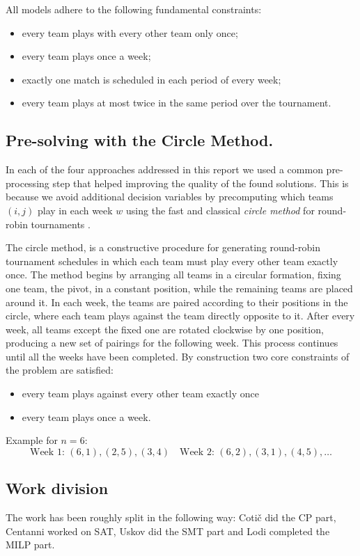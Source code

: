 All models adhere to the following fundamental constraints:
\begin{itemize}
\item every team plays with every other team only once;
\item every team plays once a week;
\item exactly one match is scheduled in each period of every week;
\item every team plays at most twice in the same period over the tournament.
\end{itemize}

\subsection{Pre-solving with the Circle Method.}
\label{CircleMatching}
In each of the four approaches addressed in this report we used a common pre-processing step that helped improving the quality of the found solutions. This is because we avoid additional decision variables by precomputing which teams $(i, j)$ play in each week $w$ using the fast and classical \emph{circle method} for round-robin tournaments \cite{dewerra1999}.

The circle method, is a constructive procedure for generating round-robin tournament schedules in which each team must play every other team exactly once. The method begins by arranging all teams in a circular formation, fixing one team, the pivot, in a constant position, while the remaining teams are placed around it. In each week, the teams are paired according to their positions in the circle, where each team plays against the team directly opposite to it. After every week, all teams except the fixed one are rotated clockwise by one position, producing a new set of pairings for the following week. This process continues until all the weeks have been completed. By construction two core constraints of the problem are satisfied:
\begin{itemize}
    \item every team plays against every other team exactly once
    \item every team plays once a week.
\end{itemize}

Example for $n = 6$:
\[
\text{Week 1: } (6,1), (2,5), (3,4) \quad \text{Week 2: } (6,2), (3,1), (4,5), \dots
\]

\subsection{Work division}
The work has been roughly split in the following way: Cotič did the CP part, Centanni worked on SAT, Uskov did the SMT part and Lodi completed the MILP part.
